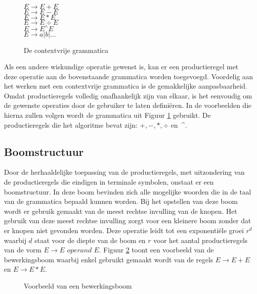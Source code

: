\documentclass[Main.tex]{subfiles}
\begin{document}
\begin{figure}[!htb]
\centering
\begin{framed}
$E \rightarrow E + E$ \\
$E \rightarrow E - E$ \\
$E \rightarrow E \ast E$ \\
$E \rightarrow E \div E$ \\
$E \rightarrow E^{\wedge}E$ \\
$E \rightarrow a | b | \dotsc$
\end{framed}
\caption{De contextvrije grammatica}
\label{fig:cfg}
\end{figure}

Als een andere wiskundige operatie gewenst is, kan er een productieregel met deze operatie aan de bovenstaande grammatica worden toegevoegd. Voordelig aan het werken met een contextvrije grammatica is de gemakkelijke aanpasbaarheid. Omdat productieregels volledig onafhankelijk zijn van elkaar, is het eenvoudig om de gewenste operaties door de gebruiker te laten defini\"eren. In de voorbeelden die hierna zullen volgen wordt de grammatica uit Figuur \ref{fig:cfg} gebruikt. De productieregels die het algoritme bevat zijn: $+, -, \ast, \div$ en~\^{}.

\subsection{Boomstructuur}

Door de herhaaldelijke toepassing van de productieregels, met uitzondering van de productieregels die eindigen in terminale symbolen, onstaat er een boomstructuur. In deze boom bevinden zich alle mogelijke woorden die in de taal van de grammatica bepaald kunnen worden. Bij het opstellen van deze boom wordt er gebruik gemaakt van de meest rechtse invulling van de knopen. Het gebruik van deze meest rechtse invulling zorgt voor een kleinere boom zonder dat er knopen niet gevonden worden. Deze operatie leidt tot een exponenti\"ele groei $r^{d}$ waarbij $d$ staat voor de diepte van de boom en $r$ voor het aantal productieregels van de vorm $E \rightarrow E$  $operand$ $ E$. Figuur \ref{fig:vbBoom} toont een voorbeeld van de bewerkingsboom waarbij enkel gebruikt gemaakt wordt van de regels $E \rightarrow E+E$ en $E \rightarrow E \ast E$.

\begin{figure}[!htb]
\centering
{}
\caption{Voorbeeld van een bewerkingsboom} \label{fig:vbBoom}
\end{figure}
\end{document}
